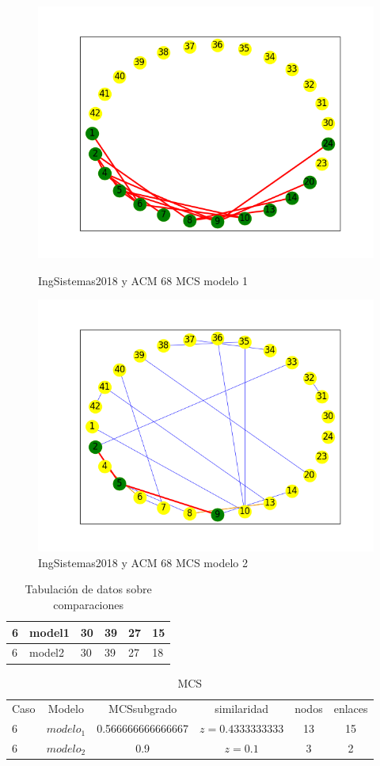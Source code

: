 \begin{figure}[H]
\centering
\includegraphics[width=0.7\linewidth]{images/sisuni2018/H_sisuni2018_cmp_acm68_m1_mcs_mix.png}
\caption{IngSistemas2018 y ACM 68 MCS modelo 1}
\label{fig:c6p1modelo1}


\includegraphics[width=0.7\linewidth]{images/sisuni2018/H_sisuni2018_cmp_acm68_m2_mcs_mix.png}
\caption{IngSistemas2018 y ACM 68 MCS modelo 2}
\label{fig:c6p1modelo2}

\end{figure}


\begin{table}[H]
\centering
\caption{Tabulación de datos sobre comparaciones}
\begin{tabular}[t]{|l|l|l|l|l|l|}
\hline
6&model1&30&39&27&15\\
\hline
6&model2&30&39&27&18\\
\hline
\end{tabular}
\label{tab:tabcomparaciones_C6}
\end{table}


\begin{table}[H]
\centering
\caption{MCS}
\begin{tabular}[t]{lccccc}
\hline
Caso & Modelo & MCSsubgrado & similaridad & nodos & enlaces \\
6 & $modelo_1$ & 0.566666666666667 & $z=0.4333333333$ & 13 & 15\\
6 & $modelo_2$ & 0.9 & $z=0.1$ & 3 & 2\\
\hline
\end{tabular}
\label{tab:tabcomparaciones_C6}
\end{table}

